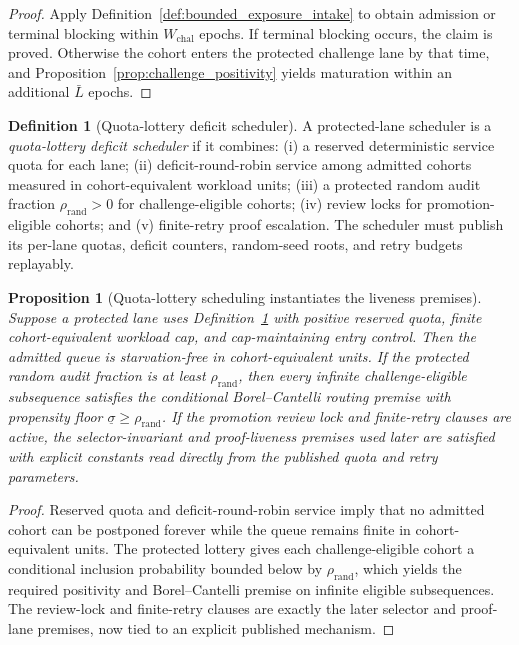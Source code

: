 \documentclass[11pt]{article}
\newtheorem{proposition}[theorem]{Proposition}
\theoremstyle{definition}
\newtheorem{definition}[theorem]{Definition}
\newcommand{\1}{\mathbf{1}}
\begin{document}
\begin{proof}
Apply Definition~\ref{def:bounded_exposure_intake} to obtain admission or terminal blocking within $W_{\mathrm{chal}}$ epochs. If terminal blocking occurs, the claim is proved. Otherwise the cohort enters the protected challenge lane by that time, and Proposition~\ref{prop:challenge_positivity} yields maturation within an additional $\bar L$ epochs.
\end{proof}

\begin{definition}[Quota-lottery deficit scheduler]\label{def:quota_scheduler}
A protected-lane scheduler is a \emph{quota-lottery deficit scheduler} if it combines: (i) a reserved deterministic service quota for each lane; (ii) deficit-round-robin service among admitted cohorts measured in cohort-equivalent workload units; (iii) a protected random audit fraction $\rho_{\mathrm{rand}}>0$ for challenge-eligible cohorts; (iv) review locks for promotion-eligible cohorts; and (v) finite-retry proof escalation. The scheduler must publish its per-lane quotas, deficit counters, random-seed roots, and retry budgets replayably.
\end{definition}

\begin{proposition}[Quota-lottery scheduling instantiates the liveness premises]\label{prop:quota_scheduler}
Suppose a protected lane uses Definition~\ref{def:quota_scheduler} with positive reserved quota, finite cohort-equivalent workload cap, and cap-maintaining entry control. Then the admitted queue is starvation-free in cohort-equivalent units. If the protected random audit fraction is at least $\rho_{\mathrm{rand}}$, then every infinite challenge-eligible subsequence satisfies the conditional Borel--Cantelli routing premise with propensity floor $\underline\sigma\ge \rho_{\mathrm{rand}}$. If the promotion review lock and finite-retry clauses are active, the selector-invariant and proof-liveness premises used later are satisfied with explicit constants read directly from the published quota and retry parameters.
\end{proposition}

\begin{proof}
Reserved quota and deficit-round-robin service imply that no admitted cohort can be postponed forever while the queue remains finite in cohort-equivalent units. The protected lottery gives each challenge-eligible cohort a conditional inclusion probability bounded below by $\rho_{\mathrm{rand}}$, which yields the required positivity and Borel--Cantelli premise on infinite eligible subsequences. The review-lock and finite-retry clauses are exactly the later selector and proof-lane premises, now tied to an explicit published mechanism.
\end{proof}
\end{document}
